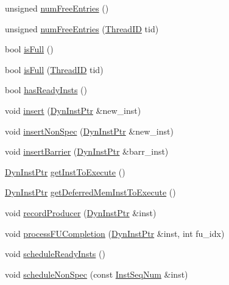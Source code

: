 \begin{DoxyCompactItemize}
unsigned \hyperlink{classInstructionQueue_a028971a565aca048c67ea1c36a6a9d51}{numFreeEntries} ()
\item 
unsigned \hyperlink{classInstructionQueue_acc878f608deead5b5319a6a3f98b50c8}{numFreeEntries} (\hyperlink{base_2types_8hh_ab39b1a4f9dad884694c7a74ed69e6a6b}{ThreadID} tid)
\item 
bool \hyperlink{classInstructionQueue_a3e70330939fdfc4dbc2f60c1a660584d}{isFull} ()
\item 
bool \hyperlink{classInstructionQueue_a30fac732df9b3fda011c7329a112cb31}{isFull} (\hyperlink{base_2types_8hh_ab39b1a4f9dad884694c7a74ed69e6a6b}{ThreadID} tid)
\item 
bool \hyperlink{classInstructionQueue_ae59aad9cee1e45b5817a9d96553e4567}{hasReadyInsts} ()
\item 
void \hyperlink{classInstructionQueue_a786595aecf8ab7aae40868b5ac4a79a7}{insert} (\hyperlink{classInstructionQueue_a028ce10889c5f6450239d9e9a7347976}{DynInstPtr} \&new\_\-inst)
\item 
void \hyperlink{classInstructionQueue_a4f7523e76440d88096a4eac14f2e0dd3}{insertNonSpec} (\hyperlink{classInstructionQueue_a028ce10889c5f6450239d9e9a7347976}{DynInstPtr} \&new\_\-inst)
\item 
void \hyperlink{classInstructionQueue_ae556f19566bae9c4f55350eab17abacd}{insertBarrier} (\hyperlink{classInstructionQueue_a028ce10889c5f6450239d9e9a7347976}{DynInstPtr} \&barr\_\-inst)
\item 
\hyperlink{classInstructionQueue_a028ce10889c5f6450239d9e9a7347976}{DynInstPtr} \hyperlink{classInstructionQueue_acf940a475d9687f26e8ab8a98c244f08}{getInstToExecute} ()
\item 
\hyperlink{classInstructionQueue_a028ce10889c5f6450239d9e9a7347976}{DynInstPtr} \hyperlink{classInstructionQueue_ae2aedd3b5257ee38cb5a4e307d2d50a5}{getDeferredMemInstToExecute} ()
\item 
void \hyperlink{classInstructionQueue_ae43022d3677118a4ab40113712045f64}{recordProducer} (\hyperlink{classInstructionQueue_a028ce10889c5f6450239d9e9a7347976}{DynInstPtr} \&inst)
\item 
void \hyperlink{classInstructionQueue_ad118e191396cf75b93afd066a6a3f486}{processFUCompletion} (\hyperlink{classInstructionQueue_a028ce10889c5f6450239d9e9a7347976}{DynInstPtr} \&inst, int fu\_\-idx)
\item 
void \hyperlink{classInstructionQueue_a3694e72427d3a616808797f9343d1fc4}{scheduleReadyInsts} ()
\item 
void \hyperlink{classInstructionQueue_a15ca5aaeab5bd4c2169ed41bbc7fb79c}{scheduleNonSpec} (const \hyperlink{inst__seq_8hh_a258d93d98edaedee089435c19ea2ea2e}{InstSeqNum} \&inst)

\end{DoxyCompactItemize}
